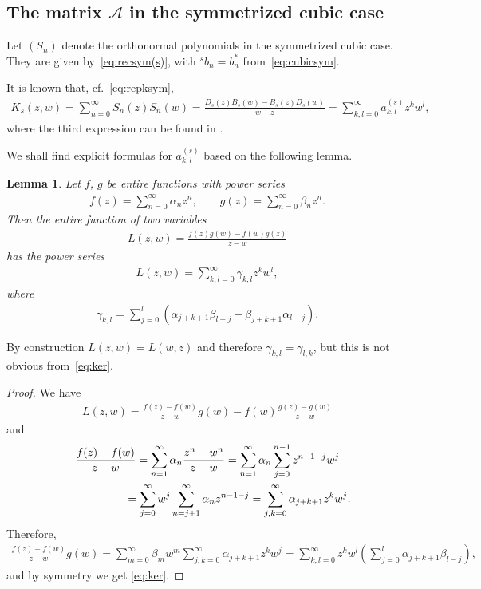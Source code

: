 \documentclass[pdftex]{sigma}
\numberwithin{equation}{section}
\newtheorem{lem}[thm]{Lemma}
\begin{document}
\subsection[The matrix $\mathcal A$ in the symmetrized cubic case]{The matrix $\boldsymbol{\mathcal A}$ in the symmetrized cubic case}

Let $(S_n)$ denote the orthonormal polynomials in the symmetrized cubic case. They are given by~\eqref{eq:recsym(s)}, with ${}^sb_n=b_n^*$ from~\eqref{eq:cubicsym}.

 It is known that, cf.~\eqref{eq:repksym},
\begin{gather*}
K_s(z,w) = \sum_{n=0}^\infty S_n(z)S_n(w)=\frac{D_s(z)B_s(w)-B_s(z)D_s(w)}{w-z} = \sum_{k,l=0}^\infty a_{k,l}^{(s)}z^kw^l,
\end{gather*}
where the third expression can be found in \cite[equation~(1.8)]{Be95}.

We shall find explicit formulas for $a_{k,l}^{(s)}$ based on the following lemma.

\begin{lem}\label{thm:kernel} Let $f$, $g$ be entire functions with power series
\begin{gather*}
f(z)=\sum_{n=0}^\infty \alpha_nz^n,\qquad g(z)=\sum_{n=0}^\infty \beta_nz^n.
\end{gather*}
Then the entire function of two variables
\begin{gather*}
L(z,w)=\frac{f(z)g(w)-f(w)g(z)}{z-w}
\end{gather*}
has the power series
\begin{gather*}
L(z,w)=\sum_{k,l=0}^\infty \gamma_{k,l}z^kw^l,
\end{gather*}
where
\begin{gather}\label{eq:ker}
\gamma_{k,l}=\sum_{j=0}^l (\alpha_{j+k+1}\beta_{l-j}-\beta_{j+k+1}\alpha_{l-j}).
\end{gather}
\end{lem}

\begin{rem}\label{rem5}By construction $L(z,w)=L(w,z)$ and therefore $\gamma_{k,l}=\gamma_{l,k}$, but this is not obvious from~\eqref{eq:ker}.
\end{rem}

\begin{proof}We have
\begin{gather*}
L(z,w)=\frac{f(z)-f(w)}{z-w} g(w)-f(w)\frac{g(z)-g(w)}{z-w}
\end{gather*}
and
\begin{gather*}
\frac{f(z)-f(w)}{z-w} = \sum_{n=1}^\infty\alpha_n\frac{z^n-w^n}{z-w}=\sum_{n=1}^\infty\alpha_n \sum_{j=0}^{n-1}z^{n-1-j}w^j\\
\hphantom{\frac{f(z)-f(w)}{z-w}}{} = \sum_{j=0}^\infty w^j\sum_{n=j+1}^\infty \alpha_n z^{n-1-j}=\sum_{j,k=0}^\infty\alpha_{j+k+1}z^kw^j.
\end{gather*}
Therefore,
\begin{gather*}
\frac{f(z)-f(w)}{z-w} g(w) = \sum_{m=0}^\infty \beta_mw^m\sum_{j,k=0}^\infty\alpha_{j+k+1}z^kw^j = \sum_{k,l=0}^\infty z^kw^l\left(\sum_{j=0}^l \alpha_{j+k+1}\beta_{l-j}\right),
\end{gather*}
and by symmetry we get \eqref{eq:ker}.
\end{proof}
\end{document}

